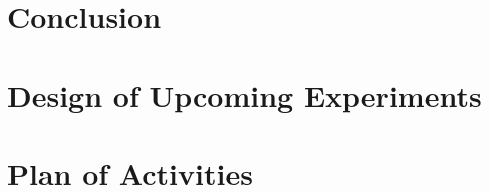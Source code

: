 \documentclass{article} %
\begin{document}
\section{Conclusion}

\section{Design of Upcoming Experiments}

\section{Plan of Activities}


\end{document}
